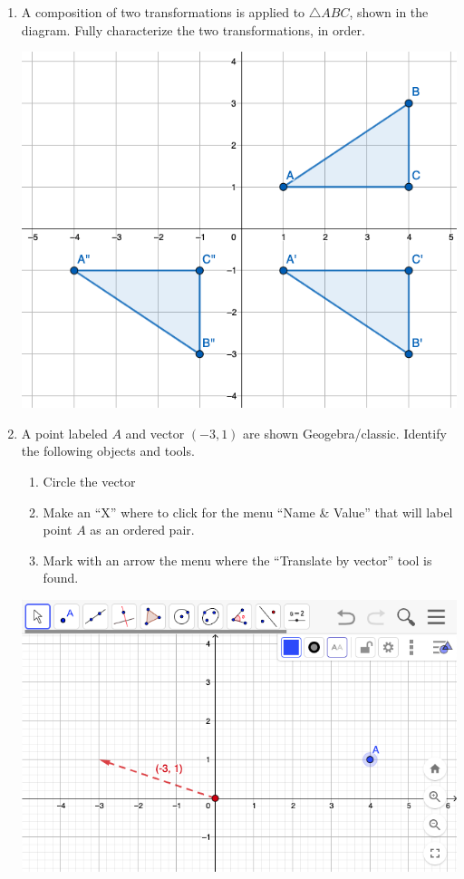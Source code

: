 \documentclass[12pt, twoside]{article}
\begin{document}
\begin{enumerate}
\newpage
\item A composition of two transformations is applied to $\triangle ABC$, shown in the diagram. Fully characterize the two transformations, in order.
    \begin{flushright}
      \includegraphics[width=5in]{5-9reflect+translate.png}
    \end{flushright}

\newpage
\item A point labeled $A$ and vector $(-3,1)$ are shown Geogebra/classic. Identify the following objects and tools.
  \begin{enumerate}
    \item Circle the vector
    \item Make an ``X'' where to click for the menu ``Name \& Value'' that will label point $A$ as an ordered pair.
    \item Mark with an arrow the menu where the ``Translate by vector'' tool is found.
  \end{enumerate}
  \begin{flushright}
    \includegraphics[width=6.25in]{5-9Geogebra_toolbar.png}
  \end{flushright}


\end{enumerate}
\end{document}
